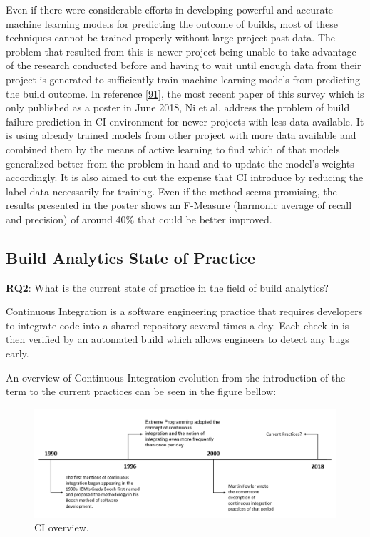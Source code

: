 \documentclass[]{book}
\begin{document}
Even if there were considerable efforts in developing powerful and
accurate machine learning models for predicting the outcome of builds,
most of these techniques cannot be trained properly without large
project past data. The problem that resulted from this is newer project
being unable to take advantage of the research conducted before and
having to wait until enough data from their project is generated to
sufficiently train machine learning models from predicting the build
outcome. In reference {[}\protect\hyperlink{ref-ni2018acona}{91}{]}, the
most recent paper of this survey which is only published as a poster in
June 2018, Ni et al. address the problem of build failure prediction in
CI environment for newer projects with less data available. It is using
already trained models from other project with more data available and
combined them by the means of active learning to find which of that
models generalized better from the problem in hand and to update the
model's weights accordingly. It is also aimed to cut the expense that CI
introduce by reducing the label data necessarily for training. Even if
the method seems promising, the results presented in the poster shows an
F-Measure (harmonic average of recall and precision) of around 40\% that
could be better improved.

\subsection{Build Analytics State of
Practice}\label{build-analytics-state-of-practice}

\textbf{RQ2}: What is the current state of practice in the field of
build analytics?

Continuous Integration is a software engineering practice that requires
developers to integrate code into a shared repository several times a
day. Each check-in is then verified by an automated build which allows
engineers to detect any bugs early.

An overview of Continuous Integration evolution from the introduction of
the term to the current practices can be seen in the figure bellow:

\begin{figure}
\centering
\includegraphics{figures/build-analytics/state_pr.png}
\caption{CI overview.}
\end{figure}
\end{document}
